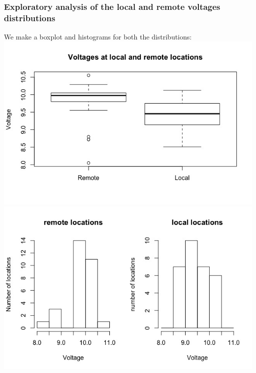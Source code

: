 \documentclass[12pt,letterpaper,titlepage,en-US]{article}
\begin{document}
\subsection{}
\subsubsection{Exploratory analysis of the local and remote voltages distributions}
We make a boxplot and histograms for both the distributions:\\
\includegraphics[scale=0.6]{boxplot2A.jpeg}\\
\includegraphics[scale=0.6]{hist2A.jpeg}\\
\end{document}
